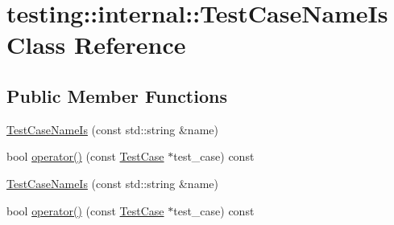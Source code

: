 \hypertarget{classtesting_1_1internal_1_1_test_case_name_is}{\section{testing\-:\-:internal\-:\-:Test\-Case\-Name\-Is Class Reference}
\label{classtesting_1_1internal_1_1_test_case_name_is}
}
\subsection*{Public Member Functions}
\begin{DoxyCompactItemize}
\item 
\hyperlink{classtesting_1_1internal_1_1_test_case_name_is_a7c983707f4cfe7f36dbabc95da5113c4}{Test\-Case\-Name\-Is} (const std\-::string \&name)
\item 
bool \hyperlink{classtesting_1_1internal_1_1_test_case_name_is_a6d6b1bf43aa7105aee9ef44edbc6d2e8}{operator()} (const \hyperlink{classtesting_1_1_test_case}{Test\-Case} $\ast$test\-\_\-case) const 
\item 
\hyperlink{classtesting_1_1internal_1_1_test_case_name_is_a7c983707f4cfe7f36dbabc95da5113c4}{Test\-Case\-Name\-Is} (const std\-::string \&name)
\item 
bool \hyperlink{classtesting_1_1internal_1_1_test_case_name_is_a6d6b1bf43aa7105aee9ef44edbc6d2e8}{operator()} (const \hyperlink{classtesting_1_1_test_case}{Test\-Case} $\ast$test\-\_\-case) const 
\end{DoxyCompactItemize}


